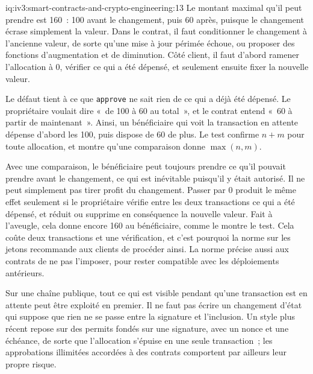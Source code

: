 \begin{solution}{iq:iv3:smart-contracts-and-crypto-engineering:13}
Le montant maximal qu'il peut prendre est 160~: 100 avant le changement, puis 60 après, puisque le changement écrase simplement la valeur. Dans le contrat, il faut conditionner le changement à l'ancienne valeur, de sorte qu'une mise à jour périmée échoue, ou proposer des fonctions d'augmentation et de diminution. Côté client, il faut d'abord ramener l'allocation à 0, vérifier ce qui a été dépensé, et seulement ensuite fixer la nouvelle valeur.
\label{lst:iv3:cr:approve}

Le défaut tient à ce que \texttt{approve} ne sait rien de ce qui a déjà été dépensé. Le propriétaire voulait dire «~de 100 à 60 au total~», et le contrat entend «~60 à partir de maintenant~». Ainsi, un bénéficiaire qui voit la transaction en attente dépense d'abord les 100, puis dispose de 60 de plus. Le test confirme $n + m$ pour toute allocation, et montre qu'une comparaison donne $\max(n, m)$.

Avec une comparaison, le bénéficiaire peut toujours prendre ce qu'il pouvait prendre avant le changement, ce qui est inévitable puisqu'il y était autorisé. Il ne peut simplement pas tirer profit du changement. Passer par 0 produit le même effet seulement si le propriétaire vérifie entre les deux transactions ce qui a été dépensé, et réduit ou supprime en conséquence la nouvelle valeur. Fait à l'aveugle, cela donne encore 160 au bénéficiaire, comme le montre le test. Cela coûte deux transactions et une vérification, et c'est pourquoi la norme sur les jetons recommande aux clients de procéder ainsi. La norme précise aussi aux contrats de ne pas l'imposer, pour rester compatible avec les déploiements antérieurs.

Sur une chaîne publique, tout ce qui est visible pendant qu'une transaction est en attente peut être exploité en premier. Il ne faut pas écrire un changement d'état qui suppose que rien ne se passe entre la signature et l'inclusion. Un style plus récent repose sur des permits fondés sur une signature, avec un nonce et une échéance, de sorte que l'allocation s'épuise en une seule transaction~; les approbations illimitées accordées à des contrats comportent par ailleurs leur propre risque.

\end{solution}

